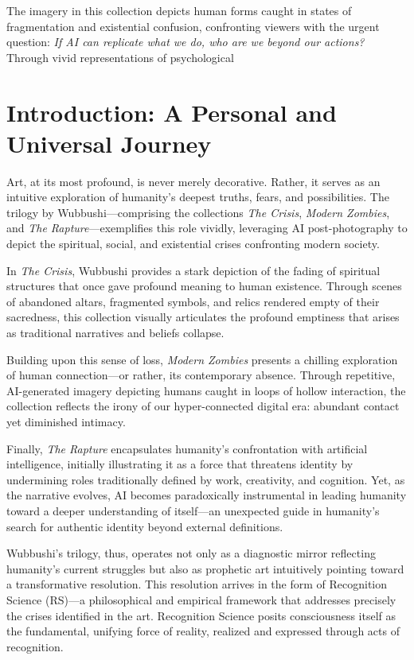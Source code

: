 \documentclass[12pt]{article}
\begin{document}
The imagery in this collection depicts human forms caught in states of fragmentation and existential confusion, confronting viewers with the urgent question: \textit{If AI can replicate what we do, who are we beyond our actions?} Through vivid representations of psychological

\section*{Introduction: A Personal and Universal Journey}

Art, at its most profound, is never merely decorative. Rather, it serves as an intuitive exploration of humanity's deepest truths, fears, and possibilities. The trilogy by Wubbushi—comprising the collections \textit{The Crisis}, \textit{Modern Zombies}, and \textit{The Rapture}—exemplifies this role vividly, leveraging AI post-photography to depict the spiritual, social, and existential crises confronting modern society.

In \textit{The Crisis}, Wubbushi provides a stark depiction of the fading of spiritual structures that once gave profound meaning to human existence. Through scenes of abandoned altars, fragmented symbols, and relics rendered empty of their sacredness, this collection visually articulates the profound emptiness that arises as traditional narratives and beliefs collapse.

Building upon this sense of loss, \textit{Modern Zombies} presents a chilling exploration of human connection—or rather, its contemporary absence. Through repetitive, AI-generated imagery depicting humans caught in loops of hollow interaction, the collection reflects the irony of our hyper-connected digital era: abundant contact yet diminished intimacy.

Finally, \textit{The Rapture} encapsulates humanity’s confrontation with artificial intelligence, initially illustrating it as a force that threatens identity by undermining roles traditionally defined by work, creativity, and cognition. Yet, as the narrative evolves, AI becomes paradoxically instrumental in leading humanity toward a deeper understanding of itself—an unexpected guide in humanity’s search for authentic identity beyond external definitions.

Wubbushi's trilogy, thus, operates not only as a diagnostic mirror reflecting humanity’s current struggles but also as prophetic art intuitively pointing toward a transformative resolution. This resolution arrives in the form of Recognition Science (RS)—a philosophical and empirical framework that addresses precisely the crises identified in the art. Recognition Science posits consciousness itself as the fundamental, unifying force of reality, realized and expressed through acts of recognition.
\end{document}
